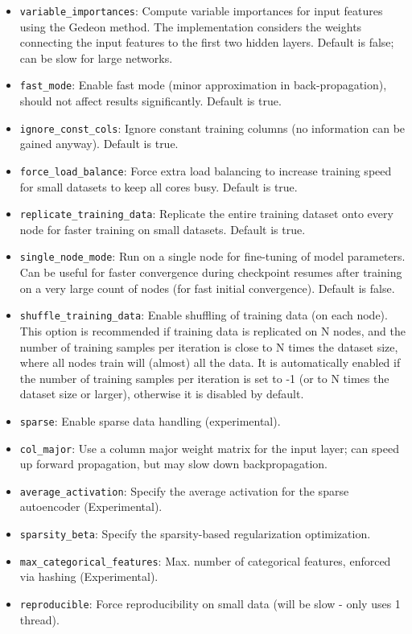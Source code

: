 \documentclass{article}[11pt]
\begin{document}
\begin{itemize}
\item \texttt{variable\_importances}: Compute variable importances for input features using the Gedeon method. The implementation considers the weights connecting the input features to the first two hidden layers. Default is false; can be slow for large networks. 
\item \texttt{fast\_mode}: Enable fast mode (minor approximation in back-propagation), should not affect results significantly. Default is true.
\item \texttt{ignore\_const\_cols}: Ignore constant training columns (no information can be gained anyway). Default is true.
\item \texttt{force\_load\_balance}:  Force extra load balancing to increase training speed for small datasets to keep all cores busy. Default is true.
\item \texttt{replicate\_training\_data}:  Replicate the entire training dataset onto every node for faster training on small datasets. Default is true.
\item \texttt{single\_node\_mode}:  Run on a single node for fine-tuning of model parameters. Can be useful for faster convergence during checkpoint resumes after training on a very large count of nodes (for fast initial convergence). Default is false.
\item \texttt{shuffle\_training\_data}: Enable shuffling of training data (on each node). This option is recommended if training data is replicated on N nodes, and the number of training samples per iteration is close to N times the dataset size, where all nodes train will (almost) all the data. It is automatically enabled if the number of training samples per iteration is set to -1 (or to N times the dataset size or larger), otherwise it is disabled by default.
\item \texttt{sparse}: Enable sparse data handling (experimental).
\item \texttt{col\_major}: Use a column major weight matrix for the input layer; can speed up forward propagation, but may slow down backpropagation. 
\item \texttt{average\_activation}: Specify the average activation for the sparse autoencoder (Experimental). 
\item \texttt{sparsity\_beta}: Specify the sparsity-based regularization optimization. 
\item \texttt{max\_categorical\_features}:  Max. number of categorical features, enforced via hashing (Experimental).
\item \texttt{reproducible}: Force reproducibility on small data (will be slow - only uses 1 thread).

\end{itemize}
\end{document}
